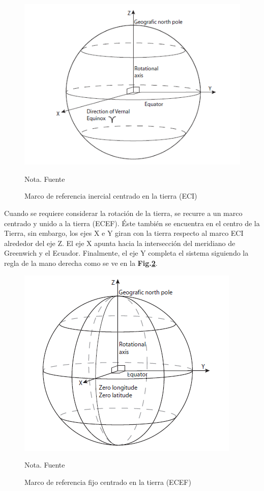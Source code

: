  \begin{figure}[!ht]
 	\begin{center}
 		\includegraphics[scale=0.7]{imagenes/marco_teorico/ECI.PNG}\\
 	\end{center}
 	\caption{ Marco de referencia inercial centrado en la tierra (ECI)}
 	\label{fig:ECI}
 	\footnotesize{Nota. Fuente \cite{Andresen2005}}
 \end{figure}
 
Cuando se requiere considerar la rotación de la tierra, se recurre a un marco centrado y unido a la tierra (ECEF). Éste también se encuentra en el centro de la Tierra, sin embargo, los ejes X e Y giran con la tierra respecto al marco ECI alrededor del eje Z. El eje X apunta hacia la intersección del meridiano de Greenwich y el Ecuador. Finalmente, el eje Y completa el sistema siguiendo la regla de la mano derecha como se ve en la \textbf{Fig.\ref{fig:ECEF}}.


 \begin{figure}[!ht]
	\begin{center}
		\includegraphics[scale=0.7]{imagenes/marco_teorico/ECEF.PNG}\\
	\end{center}
	\caption{ Marco de referencia fijo centrado en la tierra (ECEF)}
	\label{fig:ECEF}
	\footnotesize{Nota. Fuente \cite{Andresen2005}}
\end{figure}

